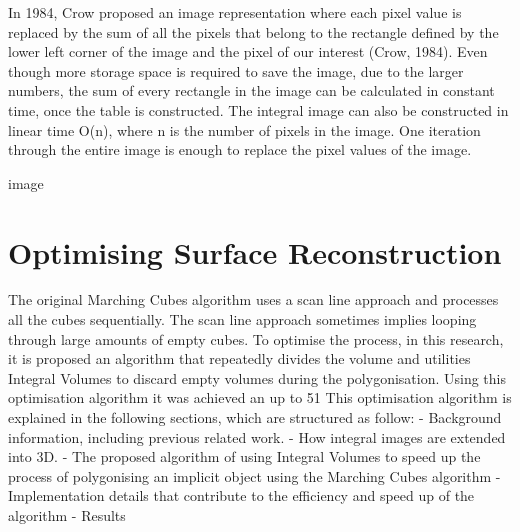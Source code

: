\documentclass{subfiles}
\begin{document}
In 1984, Crow proposed an image representation where each pixel value is replaced by the sum of all the pixels that belong to the rectangle defined by the lower left corner of the image and the pixel of our interest (Crow, 1984).  Even though more storage space is required to save the image, due to the larger numbers, the sum of every rectangle in the image can be calculated in constant time, once the table is constructed. The integral image can also be constructed in linear time O(n), where n is the number of pixels in the image. One iteration through the entire image is enough to replace the pixel values of the image. \newline

image
\newline




\section{Optimising Surface Reconstruction}\label{sec:OptimisationSurfaceReconstruction}
The original Marching Cubes algorithm uses a scan line approach and processes all the cubes sequentially. The scan line approach sometimes implies looping through large amounts of empty cubes. To optimise the process, in this research, it is proposed an algorithm that repeatedly divides the volume and utilities Integral Volumes to discard empty volumes during the polygonisation. Using this optimisation algorithm it was achieved an up to 51%
This optimisation algorithm is explained in the following sections, which are structured as follow:
-	Background information, including previous related work. 
-	How integral images are extended into 3D. 
-	The proposed algorithm of using Integral Volumes to speed up the process of polygonising an implicit object using the Marching Cubes algorithm
-	Implementation details that contribute to the efficiency and speed up of the algorithm
-	Results
\end{document}
